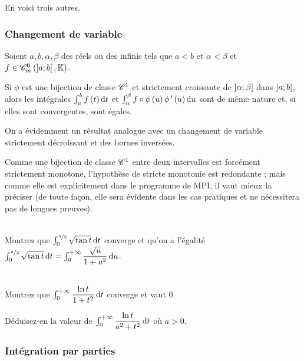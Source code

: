 En voici trois autres.

\subsubsection{Changement de variable}

\begin{prop}
Soient \(a,b,\alpha,\beta\) des réels ou des infinis tels que \(a<b\) et \(\alpha<\beta\) et \(f\in\contm[\intervee{a}{b}]\).

Si \(\phi\) est une bijection de classe \(\mathscr{C}^{1}\) et strictement croissante de \(\left]\alpha;\beta\right[\) dans \(\left]a;b\right[\), alors les intégrales \(\int_a^bf\paren{t}\odif{t}\) et \(\int_\alpha^\beta f\rond\phi\paren{u}\phi\prim\paren{u}\odif{u}\) sont de même nature et, si elles sont convergentes, sont égales.
\end{prop}

\begin{rem}
On a évidemment un résultat analogue avec un changement de variable strictement décroissant et des bornes inversées.

Comme une bijection de classe \(\mathscr{C}^{1}\) entre deux intervalles est forcément strictement monotone, l'hypothèse de stricte monotonie est redondante ; mais comme elle est explicitement dans le programme de MPI, il vaut mieux la préciser (de toute façon, elle sera évidente dans les cas pratiques et ne nécessitera pas de longues preuves).
\end{rem}

\begin{exo}~\\
Montrez que \(\int_0^{\nicefrac{\pi}{2}}\sqrt{\tan t}\odif{t}\) converge et qu'on a l'égalité \(\int_0^{\nicefrac{\pi}{2}}\sqrt{\tan t}\odif{t}=\int_0^{\pinf}\dfrac{\sqrt{u}}{1+u^2}\odif{u}\).
\end{exo}

\begin{exo}~\\
Montrez que \(\int_0^{\pinf}\dfrac{\ln t}{1+t^2}\odif{t}\) converge et vaut \(0\).

Déduisez-en la valeur de \(\int_0^{\pinf}\dfrac{\ln t}{a^2+t^2}\odif{t}\) où \(a>0\).
\end{exo}

\subsubsection{Intégration par parties}

